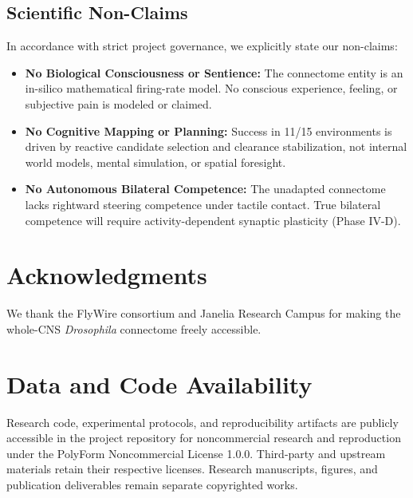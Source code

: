 \documentclass[10pt,letterpaper]{article}
\begin{document}
\subsection{Scientific Non-Claims}

In accordance with strict project governance, we explicitly state our non-claims:
\begin{itemize}
    \item \textbf{No Biological Consciousness or Sentience:} The connectome entity is an in-silico mathematical firing-rate model. No conscious experience, feeling, or subjective pain is modeled or claimed.
    \item \textbf{No Cognitive Mapping or Planning:} Success in 11/15 environments is driven by reactive candidate selection and clearance stabilization, not internal world models, mental simulation, or spatial foresight.
    \item \textbf{No Autonomous Bilateral Competence:} The unadapted connectome lacks rightward steering competence under tactile contact. True bilateral competence will require activity-dependent synaptic plasticity (Phase IV-D).
\end{itemize}

\section*{Acknowledgments}
We thank the FlyWire consortium and Janelia Research Campus for making the whole-CNS \textit{Drosophila} connectome freely accessible.

\section*{Data and Code Availability}
Research code, experimental protocols, and reproducibility artifacts are publicly accessible in the project repository for noncommercial research and reproduction under the PolyForm Noncommercial License 1.0.0. Third-party and upstream materials retain their respective licenses. Research manuscripts, figures, and publication deliverables remain separate copyrighted works.



\end{document}
